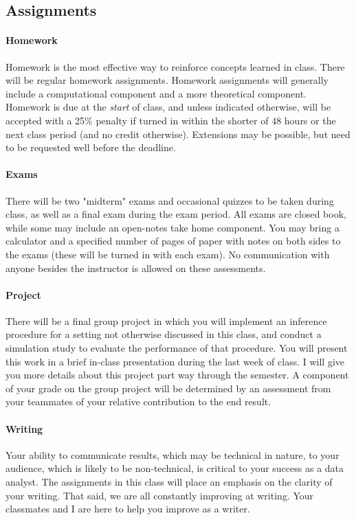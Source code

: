 \documentclass[11pt]{article}
\begin{document}
\subsection*{Assignments}

\paragraph{Homework}
Homework is the most effective way to reinforce concepts learned in class. There will be regular homework assignments. Homework assignments will generally include a computational component and a more theoretical component. Homework is due at the \emph{start} of class, and unless indicated otherwise, will be accepted with a 25\% penalty if turned in within the shorter of 48 hours or the next class period (and no credit otherwise).  Extensions may be possible, but need to be requested well before the deadline.

\paragraph{Exams}
There will be two "midterm" exams and occasional quizzes to be taken during class, as well as a final exam during the exam period.  All exams are closed book, while some may include an open-notes take home component.  You may bring a calculator and a specified number of pages of paper with notes on both sides to the exams (these will be turned in with each exam).  No communication with anyone besides the instructor is allowed on these assessments.

\paragraph{Project}
There will be a final group project in which you will implement an inference procedure for a setting not otherwise discussed in this class, and conduct a simulation study to evaluate the performance of that procedure.  You will present this work in a brief in-class presentation during the last week of class.  I will give you more details about this project part way through the semester.  A component of your grade on the group project will be determined by an assessment from your teammates of your relative contribution to the end result.

\paragraph{Writing}
Your ability to communicate results, which may be technical in nature, to your audience, which is likely to be non-technical, is critical to your success as a data analyst. The assignments in this class will place an emphasis on the clarity of your writing.  That said, we are all constantly improving at writing.  Your classmates and I are here to help you improve as a writer.
\end{document}
